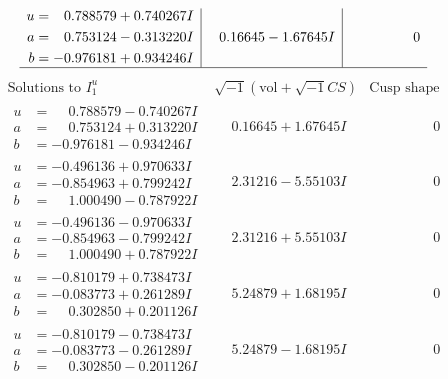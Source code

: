 \documentclass[1p]{elsarticle_modified}
\theoremstyle{definition}
\newcommand{\I}{\sqrt{-1}}
\begin{document}
$$\begin{array}{c|c|c}
\begin{aligned}
u &= \phantom{-}0.788579 + 0.740267 I \\
a &= \phantom{-}0.753124 - 0.313220 I \\
b &= -0.976181 + 0.934246 I\end{aligned}
 & \phantom{-}0.16645 - 1.67645 I & \phantom{-0.000000 } 0\\
 \hline 
 \end{array}$$\newpage$$\begin{array}{c|c|c}  
\text{Solutions to }I^u_{1}& \I (\text{vol} + \sqrt{-1}CS) & \text{Cusp shape}\\
 \hline 
\begin{aligned}
u &= \phantom{-}0.788579 - 0.740267 I \\
a &= \phantom{-}0.753124 + 0.313220 I \\
b &= -0.976181 - 0.934246 I\end{aligned}
 & \phantom{-}0.16645 + 1.67645 I & \phantom{-0.000000 } 0 \\ \hline\begin{aligned}
u &= -0.496136 + 0.970633 I \\
a &= -0.854963 + 0.799242 I \\
b &= \phantom{-}1.000490 - 0.787922 I\end{aligned}
 & \phantom{-}2.31216 - 5.55103 I & \phantom{-0.000000 } 0 \\ \hline\begin{aligned}
u &= -0.496136 - 0.970633 I \\
a &= -0.854963 - 0.799242 I \\
b &= \phantom{-}1.000490 + 0.787922 I\end{aligned}
 & \phantom{-}2.31216 + 5.55103 I & \phantom{-0.000000 } 0 \\ \hline\begin{aligned}
u &= -0.810179 + 0.738473 I \\
a &= -0.083773 + 0.261289 I \\
b &= \phantom{-}0.302850 + 0.201126 I\end{aligned}
 & \phantom{-}5.24879 + 1.68195 I & \phantom{-0.000000 } 0 \\ \hline\begin{aligned}
u &= -0.810179 - 0.738473 I \\
a &= -0.083773 - 0.261289 I \\
b &= \phantom{-}0.302850 - 0.201126 I\end{aligned}
 & \phantom{-}5.24879 - 1.68195 I & \phantom{-0.000000 } 0 \\ \hline\begin{aligned}

\end{aligned}
\end{array}$$
\end{document}
